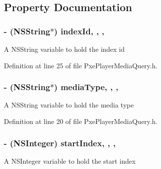 \subsection{Property Documentation}
\hypertarget{interface_pxe_player_media_query_a443b9f77e31e00aae67fc446a14e78f6}{
\subsubsection[{index\-Id}]{\setlength{\rightskip}{0pt plus 5cm}-\/ (N\-S\-String$\ast$) index\-Id\hspace{0.3cm}{\ttfamily [read]}, {\ttfamily [write]}, {\ttfamily [nonatomic]}, {\ttfamily [strong]}}}\label{interface_pxe_player_media_query_a443b9f77e31e00aae67fc446a14e78f6}
A N\-S\-String variable to hold the index id 

Definition at line 25 of file Pxe\-Player\-Media\-Query.\-h.

\hypertarget{interface_pxe_player_media_query_a50997f5a1b4f9fef65fcc3afce6abceb}{
\subsubsection[{media\-Type}]{\setlength{\rightskip}{0pt plus 5cm}-\/ (N\-S\-String$\ast$) media\-Type\hspace{0.3cm}{\ttfamily [read]}, {\ttfamily [write]}, {\ttfamily [nonatomic]}, {\ttfamily [strong]}}}\label{interface_pxe_player_media_query_a50997f5a1b4f9fef65fcc3afce6abceb}
A N\-S\-String variable to hold the media type 

Definition at line 20 of file Pxe\-Player\-Media\-Query.\-h.

\hypertarget{interface_pxe_player_media_query_a0023a0b268c748226777bbc06bbd9206}{
\subsubsection[{start\-Index}]{\setlength{\rightskip}{0pt plus 5cm}-\/ (N\-S\-Integer) start\-Index\hspace{0.3cm}{\ttfamily [read]}, {\ttfamily [write]}, {\ttfamily [nonatomic]}, {\ttfamily [assign]}}}\label{interface_pxe_player_media_query_a0023a0b268c748226777bbc06bbd9206}
A N\-S\-Integer variable to hold the start index 

